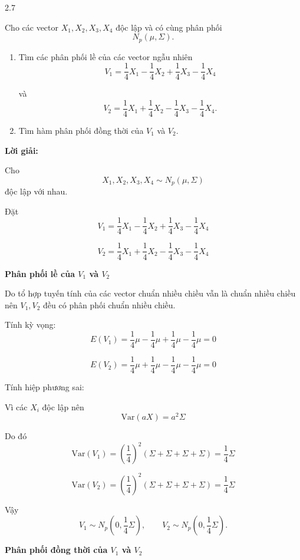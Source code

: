 \begin{question}{2.7}

Cho các vector $X_1, X_2, X_3, X_4$ độc lập và có cùng phân phối
\[
N_p(\mu,\Sigma).
\]

\begin{enumerate}
\item[(a)] Tìm các phân phối lề của các vector ngẫu nhiên
\[
V_1=\frac{1}{4}X_1-\frac{1}{4}X_2+\frac{1}{4}X_3-\frac{1}{4}X_4
\]

và
\[
V_2=\frac{1}{4}X_1+\frac{1}{4}X_2-\frac{1}{4}X_3-\frac{1}{4}X_4.
\]
\item[(b)] Tìm hàm phân phối đồng thời của $V_1$ và $V_2$.
\end{enumerate}

\textbf{Lời giải:}

Cho
\[
X_1, X_2, X_3, X_4 \sim N_p(\mu,\Sigma)
\]
độc lập với nhau.

Đặt
\[
V_1=\frac{1}{4}X_1-\frac{1}{4}X_2+\frac{1}{4}X_3-\frac{1}{4}X_4
\]

\[
V_2=\frac{1}{4}X_1+\frac{1}{4}X_2-\frac{1}{4}X_3-\frac{1}{4}X_4
\]

\begin{subquestion}
\begin{answer}
\textbf{Phân phối lề của $V_1$ và $V_2$}

Do tổ hợp tuyến tính của các vector chuẩn nhiều chiều vẫn là chuẩn nhiều chiều nên $V_1, V_2$ đều có phân phối chuẩn nhiều chiều.

Tính kỳ vọng:
\[
E(V_1)=\frac{1}{4}\mu-\frac{1}{4}\mu+\frac{1}{4}\mu-\frac{1}{4}\mu=0
\]

\[
E(V_2)=\frac{1}{4}\mu+\frac{1}{4}\mu-\frac{1}{4}\mu-\frac{1}{4}\mu=0
\]

Tính hiệp phương sai:

Vì các $X_i$ độc lập nên
\[
\mathrm{Var}(aX)=a^2\Sigma
\]

Do đó
\[
\mathrm{Var}(V_1)=\left(\frac{1}{4}\right)^2(\Sigma+\Sigma+\Sigma+\Sigma)
=\frac{1}{4}\Sigma
\]

\[
\mathrm{Var}(V_2)=\left(\frac{1}{4}\right)^2(\Sigma+\Sigma+\Sigma+\Sigma)
=\frac{1}{4}\Sigma
\]

Vậy
\[
V_1\sim N_p\left(0,\frac{1}{4}\Sigma\right),
\qquad
V_2\sim N_p\left(0,\frac{1}{4}\Sigma\right).
\]

\end{answer}
\end{subquestion}

\begin{subquestion}
\begin{answer}
\textbf{Phân phối đồng thời của $V_1$ và $V_2$}


\end{answer}
\end{subquestion}
\end{question}
